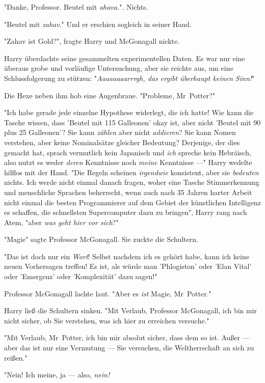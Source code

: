 {"Danke, Professor. Beutel mit \emph{ahava.}". Nichts.

"Beutel mit \emph{zahav}." Und er erschien sogleich in seiner Hand.

"Zahav ist Gold?", fragte Harry und McGonagall nickte.

Harry überdachte seine gesammelten experimentellen Daten. Es war nur eine überaus grobe und vorläufige Untersuchung, aber sie reichte aus, um eine Schlussfolgerung zu stützen: "\emph{Aaaaaaaarrrgh, das ergibt überhaupt keinen Sinn!}"

Die Hexe neben ihm hob eine Augenbraue. "Probleme, Mr~Potter?"

"Ich habe gerade jede einzelne Hypothese widerlegt, die ich hatte! Wie kann die Tasche wissen, dass 'Beutel mit 115 Galleonen' okay ist, aber nicht 'Beutel mit 90 plus 25 Galleonen'? Sie kann \emph{zählen} aber nicht \emph{addieren}? Sie kann Nomen verstehen, aber keine Nominalsätze gleicher Bedeutung? Derjenige, der dies gemacht hat, sprach vermutlich kein Japanisch und \emph{ich} spreche kein Hebräisch, also nutzt es weder \emph{deren} Kenntnisse noch \emph{meine} Kenntnisse ---" Harry wedelte hilflos mit der Hand. "Die Regeln scheinen \emph{irgendwie} konsistent, aber sie \emph{bedeuten} nichts. Ich werde nicht einmal danach fragen, woher eine Tasche Stimmerkennung und menschliche Sprachen beherrscht, wenn auch nach 35 Jahren harter Arbeit nicht einmal die besten Programmierer auf dem Gebiet der künstlichen Intelligenz es schaffen, die schnellsten Supercomputer dazu zu bringen", Harry rang nach Atem, "aber \emph{was geht hier vor sich}?"

"Magie" sagte Professor McGonagall. Sie zuckte die Schultern.

"Das ist doch nur ein \emph{Wort}! Selbst nachdem ich es gehört habe, kann ich keine neuen Vorhersagen treffen! Es ist, als würde man 'Phlogiston' oder 'Elan Vital' oder 'Emergenz' oder 'Komplexität' dazu sagen!"

Professor McGonagall lachte laut. "Aber es \emph{ist} Magie, Mr~Potter."

Harry ließ die Schultern sinken. "Mit Verlaub, Professor McGonagall, ich bin mir nicht sicher, ob Sie verstehen, was ich hier zu erreichen versuche."

"Mit Verlaub, Mr~Potter, ich bin mir absolut sicher, dass dem so ist. Außer --- aber das ist nur eine Vermutung --- Sie versuchen, die Weltherrschaft an sich zu reißen."

"Nein! Ich meine, ja --- also, \emph{nein!}

}
